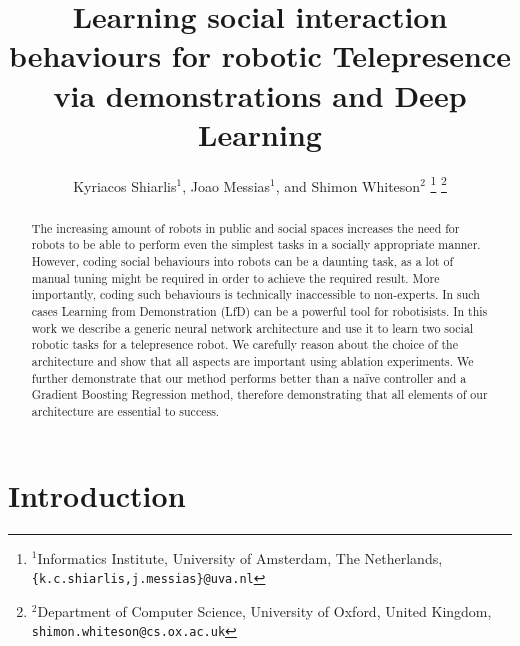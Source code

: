 \documentclass[letterpaper, 10 pt, conference]{ieeeconf}
\title{\LARGE \bf
Learning social interaction behaviours for robotic Telepresence via demonstrations and Deep Learning
}
\author{Kyriacos Shiarlis$^{1}$, Joao Messias$^{1}$, and Shimon Whiteson$^{2}$%
\thanks{$^{1}$Informatics Institute, University of Amsterdam, The Netherlands,
         {\tt\small \{k.c.shiarlis,j.messias\}@uva.nl}}%
\thanks{$^{2}$Department of Computer Science, University of Oxford, United Kingdom,
         {\tt\small shimon.whiteson@cs.ox.ac.uk}}%
}
\begin{document}
\maketitle

\thispagestyle{empty}
\pagestyle{empty}


\begin{abstract}
The increasing amount of robots in public and social spaces increases the need for robots to be able to perform even the simplest tasks in a socially appropriate manner. However, coding social behaviours into robots can be a daunting task, as a lot of manual tuning might be required in order to achieve the required result. More importantly, coding such behaviours is technically inaccessible to non-experts.  In such cases Learning from Demonstration (LfD) \cite{argall2009survey} can be a powerful tool for robotisists. In this work we describe a generic neural network architecture and use it to learn two social robotic tasks for a telepresence robot. We carefully reason about the choice of the architecture and show that all aspects are important using ablation experiments.  We further demonstrate that our method performs better than a naïve controller and a Gradient Boosting Regression method, therefore demonstrating that all elements of our architecture are essential to success. 

\end{abstract}


\section{Introduction}
\end{document}
